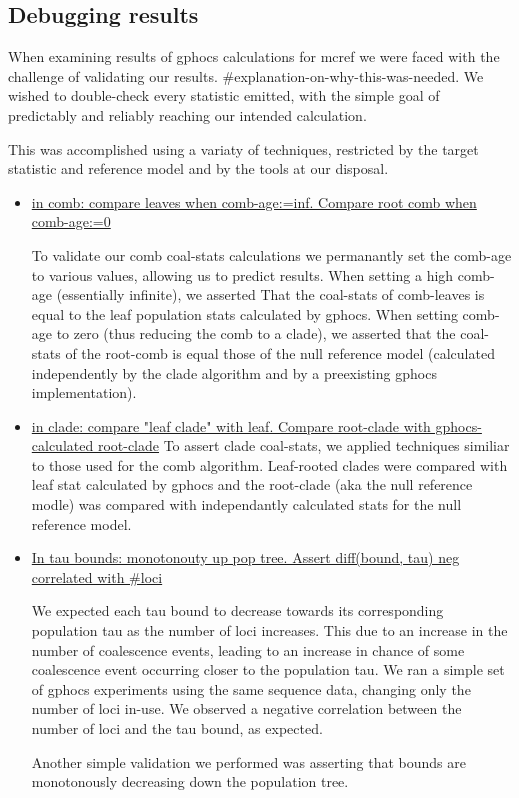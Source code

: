 \documentclass[11pt]{article}
\begin{document}
\subsection{Debugging results}

When examining results of gphocs calculations for mcref we were faced with the challenge of validating our results. \#explanation-on-why-this-was-needed. We wished to double-check every statistic emitted, with the simple goal of predictably and reliably reaching our intended calculation.

This was accomplished using a variaty of techniques, restricted by the target statistic and reference model and by the tools at our disposal. 


\begin{itemize}

\item \underline{in comb: compare leaves when comb-age:=inf. Compare root comb when comb-age:=0}

To validate our comb coal-stats calculations we permanantly set the comb-age to various values, allowing us to predict results. When setting a high comb-age (essentially infinite), we asserted That the coal-stats of comb-leaves is equal to the leaf population stats calculated by gphocs. When setting comb-age to zero (thus reducing the comb to a clade), we asserted that the coal-stats of the root-comb is equal those of the null reference model (calculated independently by the clade algorithm and by a preexisting gphocs implementation).



\item \underline{in clade: compare "leaf clade" with leaf. Compare root-clade with gphocs-calculated root-clade}
To assert clade coal-stats, we applied techniques similiar to those used for the comb algorithm. Leaf-rooted clades were compared with leaf stat calculated by gphocs and the root-clade (aka the null reference modle) was compared with independantly calculated stats for the null reference model. 

\item \underline{In tau bounds: monotonouty up pop tree. Assert diff(bound, tau) neg correlated with \#loci}

We expected each tau bound to decrease towards its corresponding population tau as the number of loci increases. This due to an increase in the number of coalescence events, leading to an increase in chance of some coalescence event occurring closer to the population tau. We ran a simple set of gphocs experiments using the same sequence data, changing only the number of loci in-use. We observed a negative correlation between the number of loci and the tau bound, as expected.

Another simple validation we performed was asserting that bounds are monotonously decreasing down the population tree.

\end{itemize}
\end{document}
